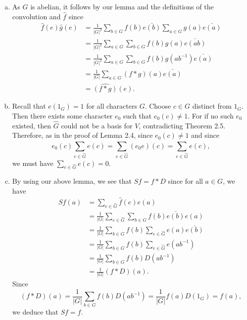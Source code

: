 \begin{exrc}[13]
\begin{soln}
    \begin{enumerate}[(a)]
    \item
        As \(G\) is abelian, it follows by our lemma and the definitions of the convolution
        and \(\hat{f}\) since
        \begin{align*}
            \hat{f}(e) \hat{g}(e)
            &= \frac{1}{|G|^2} \sum_{b \in G}^{} f(b) \bar{e(b)} \sum_{a \in G}^{} g(a) \bar{e(a)} \\
            &= \frac{1}{|G|^2} \sum_{a \in G}^{} \sum_{b \in G}^{} f(b) g(a) \bar{e(ab)} \\
            &= \frac{1}{|G|^2} \sum_{a \in G}^{} \sum_{b \in G}^{} f(b) g(a b^{-1}) \bar{e(a)} \\
            &= \frac{1}{|G|} \sum_{a \in G}^{} (f * g)(a) \bar{e(a)} \\
            &= \hat{(f * g)}(e).
        \end{align*}


    \item
        Recall that \(e(1_G) = 1\) for all characters \(G\).
        Choose \(c \in G\) distinct from \(1_G\).
        Then there exists some character \(e_0\) such that \(e_0(c) \neq 1\).
        For if no such \(e_0\) existed,
        then \(\hat{G}\) could not be a basis for \(V\),
        contradicting Theorem 2.5.
        Therefore, as in the proof of Lemma 2.4, since \(e_0(c) \neq 1\) and since
        \begin{equation*}
            e_0(c) \sum_{e \in \hat{G}}^{} e(c)
            = \sum_{e \in \hat{G}}^{} (e_0 e)(c)
            = \sum_{e \in \hat{G}}^{} e(c),
        \end{equation*}
        we must have \(\sum_{e \in \hat{G}}^{} e(c) = 0\).

    \item
        By using our above lemma,
        we see that \(Sf = f * D\) since for all \(a \in G\), we have
        \begin{align*}
            Sf(a)
            &= \sum_{e \in \hat{G}}^{} \hat{f}(e) e(a) \\
            &= \frac{1}{|G|} \sum_{e \in \hat{G}}^{} \sum_{b \in G}^{} f(b) \bar{e(b)} e(a) \\
            &= \frac{1}{|G|} \sum_{b \in G}^{} f(b) \sum_{e \in \hat{G}}^{} e(a) \bar{e(b)} \\
            &= \frac{1}{|G|} \sum_{b \in G}^{} f(b) \sum_{e \in \hat{G}}^{} e(a b^{-1}) \\
            &= \frac{1}{|G|} \sum_{b \in G}^{} f(b) D(a b^{-1}) \\
            &= \frac{1}{|G|} (f * D)(a).
        \end{align*}
        Since
        \begin{equation*}
            (f * D)(a) = \frac{1}{|G|} \sum_{b \in G}^{} f(b) D(a b^{-1})
            = \frac{1}{|G|} f(a) D(1_G) = f(a),
        \end{equation*}
        we deduce that \(Sf = f\).
    \end{enumerate}

\end{soln}
\end{exrc}
